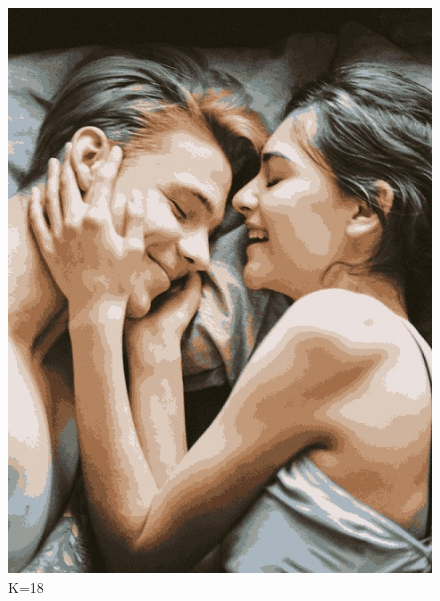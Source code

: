 \documentclass[11pt]{article}
\begin{document}
\begin{figure}
  \includegraphics[width=\linewidth]{figures/lovers_K=18.jpg}
  \caption{K=18}
\end{figure}
\end{document}

